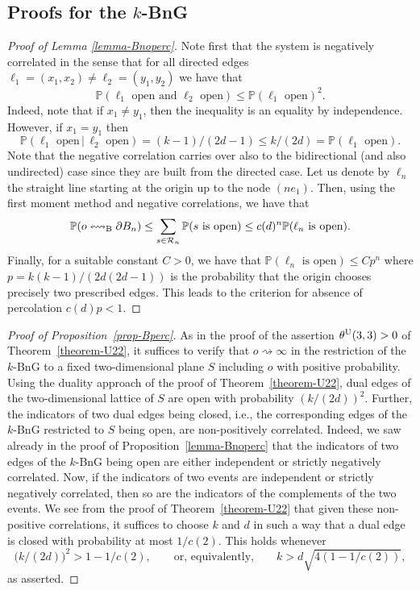 \documentclass[a4paper, oneside, 11pt]{amsart}
\theoremstyle{definition}
\renewcommand{\P}{\mathbb{P}}
\newcommand{\1}{\mathbbm{1}}
\newcommand{\0}{\mathbf{o}}
\newcommand*{\be}{\begin{equation}}
\newcommand*{\ee}{\end{equation}}
\numberwithin{equation}{section}
\begin{document}
\subsection{Proofs for the $k$-BnG}
\begin{proof}[Proof of Lemma \ref{lemma-Bnoperc}]
Note first that the system is negatively correlated in the sense that for all directed edges $\ell_1=(x_1,x_2)\neq\ell_2=(y_1,y_2)$ we have that
$$
\mathbb P(\ell_1\text{ open and }\ell_2\text{ open})\le \mathbb P(\ell_1\text{ open})^2.
$$
Indeed, note that if $x_1\neq y_1$, then the inequality is an equality by independence. However, if $x_1=y_1$ then 
$$
\mathbb P(\ell_1\text{ open}\,|\,\ell_2\text{ open})=(k-1)/(2d-1)\le k/(2d)=\mathbb P(\ell_1\text{ open}).
$$
Note that the negative correlation carries over also to the bidirectional (and also undirected) case since they are built from the directed case. Let us denote by $\ell_n$ the straight line starting at the origin up to the node $(ne_1)$. Then, using the first moment method and negative correlations, we have that 
\begin{align*}
\P(o\leftrightsquigarrow_{\rm B}\partial B_n)\le \sum_{s\in \mathcal R_n}\P(s\text{ is open})\le c(d)^n\P(\ell_n\text{ is open}).
\end{align*}
Finally, for a suitable constant $C>0$, we have that $\P(\ell_n\text{ is open})\le C p^n$ where $p=k(k-1)/(2d(2d-1))$ is the probability that the origin chooses precisely two prescribed edges. This leads to the criterion for absence of percolation $c(d)p<1$.
\end{proof}

\begin{proof}[Proof of Proposition~\ref{prop-Bperc}]
As in the proof of the assertion $\theta^{\rm U}(3,3)>0$ of Theorem~\ref{theorem-U22}, it suffices to verify that $o \rightsquigarrow \infty$ in the restriction of the $k$-BnG to a fixed two-dimensional plane $S$ including $o$ with positive probability. Using the duality approach of the proof of Theorem~\ref{theorem-U22}, dual edges of the two-dimensional lattice of $S$ are open with probability  $(k/(2d))^2$. 
Further, the indicators of two dual edges being closed, i.e., the corresponding edges of the $k$-BnG restricted to $S$ being open, are non-positively correlated. Indeed, we saw already in the proof of Proposition~\ref{lemma-Bnoperc} that the indicators of two edges of the $k$-BnG being open are either independent or strictly negatively correlated. Now, if the indicators of two events are independent or strictly negatively correlated, then so are the indicators of the complements of the two events. We see from the proof of Theorem~\ref{theorem-U22} that given these non-positive correlations, it suffices to choose $k$ and $d$ in such a way that a dual edge is closed with probability at most $1/c(2)$. This holds whenever 
\be  
\big(k/(2d)\big)^2 > 1-1/c(2),\qquad \text{or, equivalently,}\qquad k>d\sqrt{4(1-1/c(2))}, 
\ee
as asserted. 
\end{proof}
\end{document}
